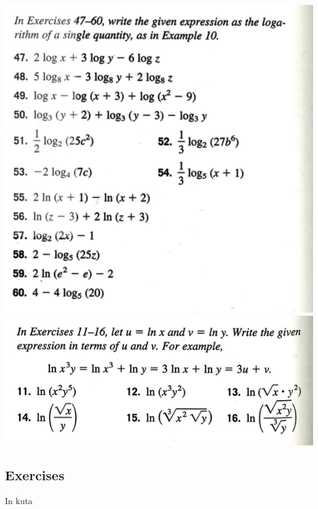 \newpage
{}
\newpage

\newpage

\includegraphics[scale=0.5]{ch07/0703xA.png}
\includegraphics[scale=0.5]{ch07/0703xB.png}

\newpage
{}
\newpage

\newpage
\subsection{Exercises}
In kuta


\newpage
{}
